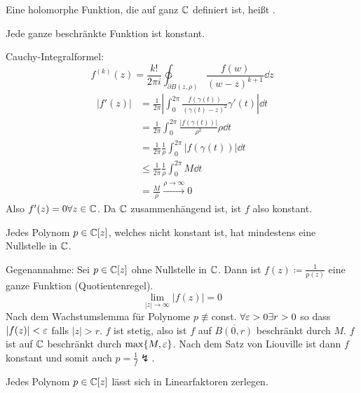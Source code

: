 \begin{definition}
	Eine holomorphe Funktion, die auf ganz $ \mathbb{C} $ definiert ist, hei\ss t .
\end{definition}
\begin{satz}
	Jede ganze beschr\"ankte Funktion ist konstant.
\end{satz}
\begin{beweis}
	Cauchy-Integralformel:
	\[ f^{(k)}(z)=\frac{k!}{2\pi i}\ointctrclockwise_{\partial B(z,\rho)}\frac{f(w)}{(w-z)^{k+1}}\dd z \]
	\begin{align*} |f'(z)|&=\frac{1}{2\pi}\left|\int_0^{2\pi}\frac{f(\gamma(t))}{(\gamma(t)-z)^2}\gamma'(t)\right|\dd t\\&=\frac{1}{2\pi}\int_0^{2\pi}\frac{|f(\gamma(t))|}{\rho^2}\rho\dd t\\&=\frac{1}{2\pi}\frac{1}{\rho}\int_0^{2\pi}|f(\gamma(t))|\dd t\\&\leq\frac{1}{2\pi}\frac{1}{\rho}\int_0^{2\pi}M\dd t\\&=\frac{M}{\rho}\xrightarrow{\rho\to\infty}0\end{align*}
	Also $ f'(z)=0\forall z\in\mathbb{C} $. Da $ \mathbb{C} $ zusammenh\"angend ist, ist $ f $ also konstant.
\end{beweis}
\begin{satz}
	Jedes Polynom $ p\in\mathbb{C}[z] $, welches nicht konstant ist, hat mindestens eine Nullstelle in $ \mathbb{C} $.
\end{satz}
\begin{beweis}
	Gegenannahme: Sei $ p\in\mathbb{C}[z] $ ohne Nullstelle in $ \mathbb{C} $. Dann ist $ f(z)\coloneqq\frac{1}{p(z)} $ eine ganze Funktion (Quotientenregel).
	\[ \lim_{|z|\to\infty}|f(z)|=0 \]
	Nach dem Wachstumslemma f\"ur Polynome $ p\not\equiv $const. $ \forall\varepsilon>0\exists r>0 $ so dass $ |f(z)|<\varepsilon $ falls $ |z|>r $. $ f $ ist stetig, also ist $ f $ auf $ \overline{B(0,r)} $ beschr\"ankt durch $ M $. $ f $ ist auf $ \mathbb{C} $ beschr\"ankt durch $ \max\lbrace M,\varepsilon\rbrace $. Nach dem Satz von Liouville ist dann $ f $ konstant und somit auch $ p=\frac{1}{f}\lightning $.
\end{beweis}
\newpage
\begin{korollar}
	Jedes Polynom $ p\in\mathbb{C}[z] $ l\"asst sich in Linearfaktoren zerlegen.
\end{korollar}
